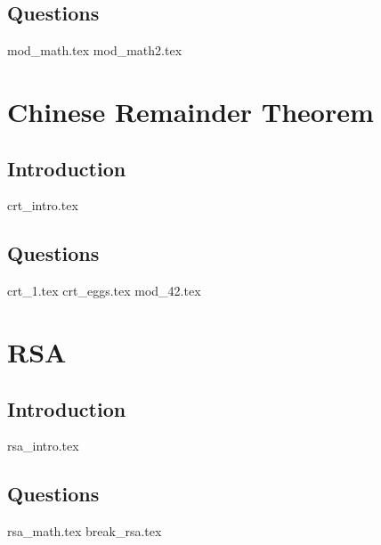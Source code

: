 \documentclass{exam}
\begin{document}
\subsection{Questions}
\begin{questions}
{mod_math.tex}
{mod_math2.tex}
\end{questions}

\section{Chinese Remainder Theorem}
\subsection{Introduction}
{crt_intro.tex}
\subsection{Questions}
\begin{questions}
{crt_1.tex}
{crt_eggs.tex}
{mod_42.tex}
\end{questions}

\section{RSA}
\subsection{Introduction}
{rsa_intro.tex}
\subsection{Questions}
\begin{questions}
{rsa_math.tex}
{break_rsa.tex}
\end{questions}
\end{document}
